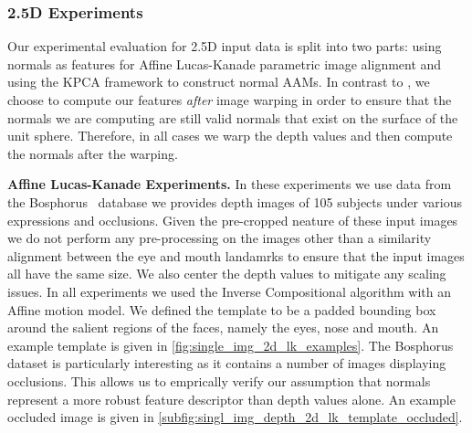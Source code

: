 \subsubsection{2.5D Experiments}\label{subsubsec:singl_img_2d_lk_experiments}
Our experimental evaluation for 2.5D input data is split into two parts: using
normals as features for Affine Lucas-Kanade parametric image alignment and
using the KPCA framework to construct normal AAMs. In contrast to
\citet{antonakos2015feature}, we choose to compute our features \textit{after}
image warping in order to ensure that the normals we are computing are still
valid normals that exist on the surface of the unit sphere. Therefore, in all
cases we warp the depth values and then compute the normals after the
warping.

\textbf{Affine Lucas-Kanade Experiments.} In these experiments we use data
from the Bosphorus~\cite{Savran:2008gg} database we provides depth images
of 105 subjects under various expressions and occlusions. Given the pre-cropped
neature of these input images we do not perform any pre-processing on the
images other than a similarity alignment between the eye and mouth landamrks to
ensure that the input images all have the same size. We also center the depth
values to mitigate any scaling issues. In all experiments we used the 
Inverse Compositional algorithm with an Affine motion model.
We defined the template to be a padded
bounding box around the salient regions of the faces, namely the eyes, nose and
mouth. An example template is given in \cref{fig:single_img_2d_lk_examples}.
The Bosphorus dataset is particularly interesting as it contains a number of
images displaying occlusions. This allows us to emprically verify our assumption
that normals represent a more robust feature descriptor than depth values alone.
An example occluded image is given in
\cref{subfig:singl_img_depth_2d_lk_template_occluded}.

